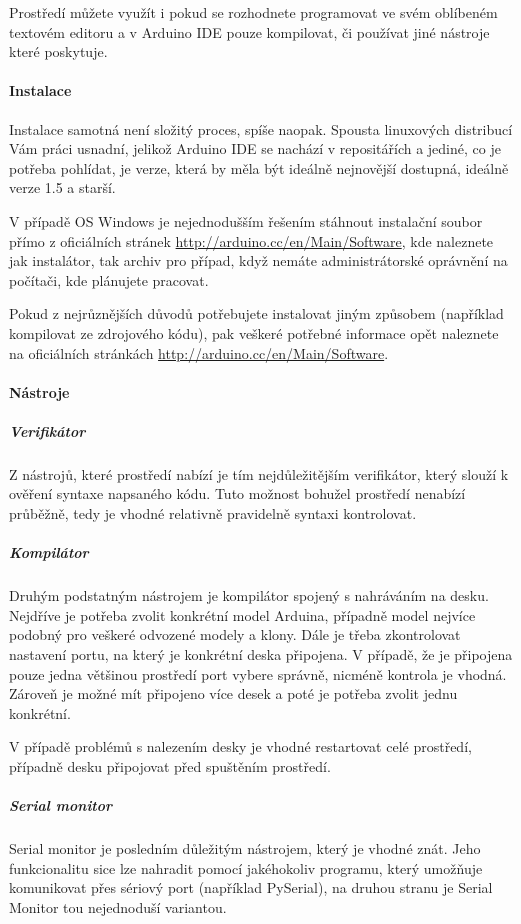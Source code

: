 \documentclass[12pt,titlepage]{article}
\begin{document}
	Prostředí můžete využít i pokud se rozhodnete programovat ve svém oblíbeném textovém editoru a v Arduino IDE pouze kompilovat, či používat jiné nástroje které poskytuje.
		\paragraph{Instalace}
			Instalace samotná není složitý proces, spíše naopak. Spousta linuxových distribucí Vám práci usnadní, jelikož Arduino IDE se nachází v repositářích a jediné, co je potřeba pohlídat, je verze, která by měla být ideálně nejnovější dostupná, ideálně verze 1.5 a starší. 
			
			V případě OS Windows je nejednodušším řešením stáhnout instalační soubor přímo z oficiálních stránek \url{http://arduino.cc/en/Main/Software}, kde naleznete jak instalátor, tak archiv pro případ, když nemáte administrátorské oprávnění na počítači, kde plánujete pracovat.
			
			Pokud z nejrůznějších důvodů potřebujete instalovat jiným způsobem (například kompilovat ze zdrojového kódu), pak veškeré potřebné informace opět naleznete na oficiálních stránkách \url{http://arduino.cc/en/Main/Software}.  
		\paragraph{Nástroje}
		
		\subparagraph{Verifikátor}
			Z nástrojů, které prostředí nabízí je tím nejdůležitějším verifikátor, který slouží k ověření syntaxe napsaného kódu. Tuto možnost bohužel prostředí nenabízí průběžně, tedy je vhodné relativně pravidelně syntaxi kontrolovat.
			
		\subparagraph{Kompilátor }
			Druhým podstatným nástrojem je kompilátor spojený s nahráváním na desku. Nejdříve je potřeba zvolit konkrétní model Arduina, případně model nejvíce podobný pro veškeré odvozené modely a klony.  Dále je třeba zkontrolovat nastavení portu, na který je konkrétní deska připojena. V případě, že je připojena pouze jedna většinou prostředí port vybere správně, nicméně kontrola je vhodná. Zároveň je možné mít připojeno více desek a poté je potřeba zvolit jednu konkrétní.
		
			V případě problémů s nalezením desky je vhodné restartovat celé prostředí, případně desku připojovat před spuštěním prostředí.
			
		\subparagraph{Serial monitor}
			Serial monitor je posledním důležitým nástrojem, který je vhodné znát. Jeho funkcionalitu sice lze nahradit pomocí jakéhokoliv programu, který umožňuje komunikovat přes sériový port (například PySerial), na druhou stranu je Serial Monitor tou nejednoduší variantou. 
			
\end{document}
